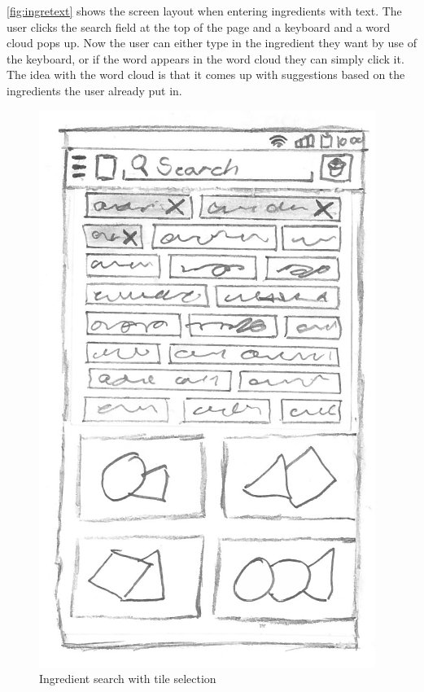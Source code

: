 \autoref{fig:ingretext} shows the screen layout when entering ingredients with text. The user clicks the search field at the top of the page and a keyboard and a word cloud pops up. Now the user can either type in the ingredient they want by use of the keyboard, or if the word appears in the word cloud they can simply click it. The idea with the word cloud is that it comes up with suggestions based on the ingredients the user already put in.

\begin{figure}[H]
\begin{minipage}[b]{0.5\columnwidth}
\centering
\includegraphics[width=0.7\columnwidth]{img/prototypes/ingredient_search_tile.pdf}
\caption{Ingredient search with tile selection\label{fig:ingreani}}
\end{minipage}
\hspace{0.5cm}
\begin{minipage}[b]{0.5\columnwidth}
\centering

\end{minipage}
\end{figure}
